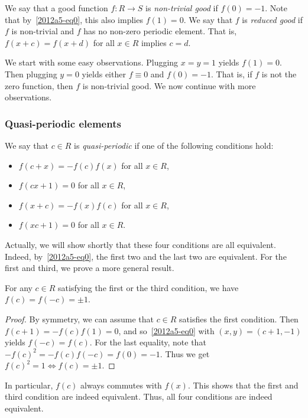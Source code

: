We say that a good function $f : R \to S$ is \emph{non-trivial good} if $f(0) = -1$.
Note that by~\eqref{2012a5-eq0}, this also implies $f(1) = 0$.
We say that $f$ is \emph{reduced good} if $f$ is non-trivial and $f$ has no non-zero periodic element.
That is, $f(x + c) = f(x + d)$ for all $x \in R$ implies $c = d$.

We start with some easy observations.
Plugging $x = y = 1$ yields $f(1) = 0$.
Then plugging $y = 0$ yields either $f \equiv 0$ and $f(0) = -1$.
That is, if $f$ is not the zero function, then $f$ is non-trivial good.
We now continue with more observations.




\subsubsection*{Quasi-periodic elements}

We say that $c \in R$ is \emph{quasi-periodic} if one of the following conditions hold:
\begin{itemize}
    \item   $f(c + x) = -f(c) f(x)$ for all $x \in R$,
    \item   $f(cx + 1) = 0$ for all $x \in R$,
    \item   $f(x + c) = -f(x) f(c)$ for all $x \in R$,
    \item   $f(xc + 1) = 0$ for all $x \in R$.
\end{itemize}

Actually, we will show shortly that these four conditions are all equivalent.
Indeed, by~\eqref{2012a5-eq0}, the first two and the last two are equivalent.
For the first and third, we prove a more general result.

\begin{claim}
For any $c \in R$ satisfying the first or the third condition, we have $f(c) = f(-c) = \pm 1$.
\end{claim}
\begin{proof}
By symmetry, we can assume that $c \in R$ satisfies the first condition.
Then $f(c + 1) = -f(c) f(1) = 0$, and so~\eqref{2012a5-eq0} with $(x, y) = (c + 1, -1)$ yields $f(-c) = f(c)$.
For the last equality, note that $-f(c)^2 = -f(c) f(-c) = f(0) = -1$.
Thus we get $f(c)^2 = 1 \iff f(c) = \pm 1$.
\end{proof}

In particular, $f(c)$ always commutes with $f(x)$.
This shows that the first and third condition are indeed equivalent.
Thus, all four conditions are indeed equivalent.

